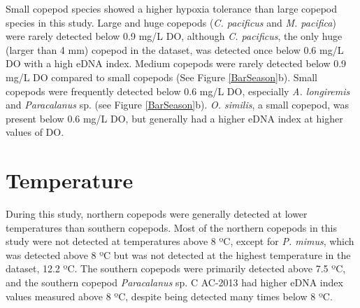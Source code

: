 \documentclass[12pt,twoside]{reedthesis}
\begin{document}
{	%
	Small copepod species showed a higher hypoxia tolerance than large copepod species in this study. Large and huge copepods (\textit{C. pacificus} and \textit{M. pacifica}) were rarely detected below 0.9 mg/L DO, although \textit{C. pacificus}, the only huge (larger than 4 mm) copepod in the dataset, was detected once below 0.6 mg/L DO with a high eDNA index. Medium copepods were rarely detected below 0.9 mg/L DO compared to small copepods (See Figure \ref{BarSeason}b). Small copepods were frequently detected below 0.6 mg/L DO, especially \textit{A. longiremis} and \textit{Paracalanus} sp. (see Figure \ref{BarSeason}b). \textit{O. similis}, a small copepod, was present below 0.6 mg/L DO, but generally had a higher eDNA index at higher values of DO.
	
	
	\section{Temperature}
	
	During this study, northern copepods were generally detected at lower temperatures than southern copepods. Most of the northern copepods in this study were not detected at temperatures above 8 ºC, except for \textit{P. mimus}, which was detected above 8 ºC but was not detected at the highest temperature in the dataset, 12.2 ºC. The southern copepods were primarily detected above 7.5 ºC, and the southern copepod \textit{Paracalanus} sp. C AC-2013 had higher eDNA index values measured above 8 ºC, despite being detected many times below 8 ºC. 
	
}
\end{document}
